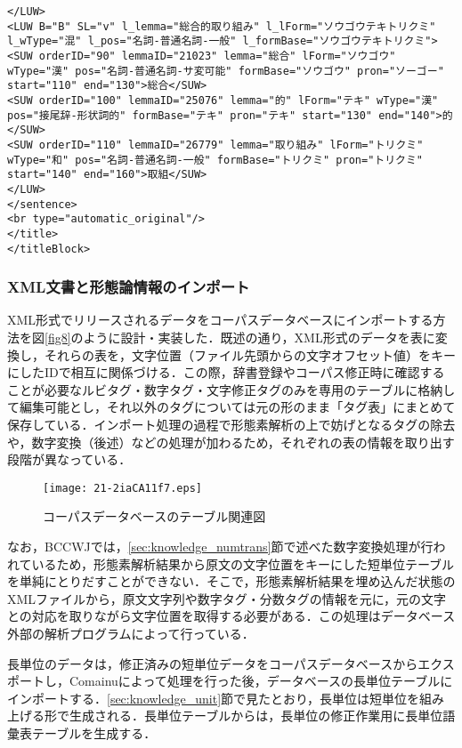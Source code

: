 \documentclass[japanese]{jnlp_1.4}
\begin{document}
\begin{lstlisting}[title=\textbf{リスト1}　短単位と長単位のアノテーション例（X-XML）]
</LUW>
<LUW B="B" SL="v" l_lemma="総合的取り組み" l_lForm="ソウゴウテキトリクミ" l_wType="混" l_pos="名詞-普通名詞-一般" l_formBase="ソウゴウテキトリクミ">
<SUW orderID="90" lemmaID="21023" lemma="総合" lForm="ソウゴウ" wType="漢" pos="名詞-普通名詞-サ変可能" formBase="ソウゴウ" pron="ソーゴー" start="110" end="130">総合</SUW>
<SUW orderID="100" lemmaID="25076" lemma="的" lForm="テキ" wType="漢" pos="接尾辞-形状詞的" formBase="テキ" pron="テキ" start="130" end="140">的</SUW>
<SUW orderID="110" lemmaID="26779" lemma="取り組み" lForm="トリクミ" wType="和" pos="名詞-普通名詞-一般" formBase="トリクミ" pron="トリクミ" start="140" end="160">取組</SUW>
</LUW>
</sentence>
<br type="automatic_original"/>
</title>
</titleBlock>
\end{lstlisting}


\subsubsection*{XML文書と形態論情報のインポート}

XML形式でリリースされるデータをコーパスデータベースにインポートする方法を図\ref{fig8}のように設計・実装した．既述の通り，XML形式のデータを表に変換し，それらの表を，文字位置（ファイル先頭からの文字オフセット値）をキーにしたIDで相互に関係づける．この際，辞書登録やコーパス修正時に確認することが必要なルビタグ・数字タグ・文字修正タグのみを専用のテーブルに格納して編集可能とし，それ以外のタグについては元の形のまま「タグ表」にまとめて保存している．インポート処理の過程で形態素解析の上で妨げとなるタグの除去や，数字変換（後述）などの処理が加わるため，それぞれの表の情報を取り出す段階が異なっている．


\begin{figure}[t]
\begin{center}
\texttt{[image: 21-2iaCA11f7.eps]}
\end{center}
\caption{コーパスデータベースのテーブル関連図}
\label{fig7}
\end{figure}

なお，BCCWJでは，\ref{sec:knowledge_numtrans}節で述べた数字変換処理が行われているため，形態素解析結果から原文の文字位置をキーにした短単位テーブルを単純にとりだすことができない．そこで，形態素解析結果を埋め込んだ状態のXMLファイルから，原文文字列や数字タグ・分数タグの情報を元に，元の文字との対応を取りながら文字位置を取得する必要がある．この処理はデータベース外部の解析プログラムによって行っている．

長単位のデータは，修正済みの短単位データをコーパスデータベースからエクスポートし，Comainuによって処理を行った後，データベースの長単位テーブルにインポートする．\ref{sec:knowledge_unit}節で見たとおり，長単位は短単位を組み上げる形で生成される．長単位テーブルからは，長単位の修正作業用に長単位語彙表テーブルを生成する．
\end{document}
